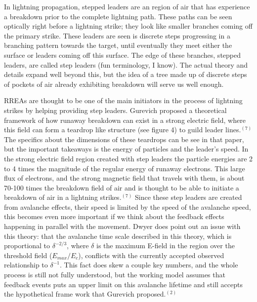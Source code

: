 \documentclass[11pt]{article}
\begin{document}
\begin{multicols*}{2}
    In lightning propagation, stepped leaders are an region of air that has experience a breakdown prior to the complete lightning path. These paths can be seen optically right before a lightning strike; they look like smaller branches coming off the primary strike. These leaders are seen is discrete steps progressing in a branching pattern towards the target, until eventually they meet either the surface or leaders coming off this surface. The edge of these branches, stepped leaders, are called step leaders (fun terminology, I know). The actual theory and details expand well beyond this, but the idea of a tree made up of discrete steps of pockets of air already exhibiting breakdown will serve us well enough.
    
    RREAs are thought to be one of the main initiators in the process of lightning strikes by helping providing step leaders. Gurevich proposed a theoretical framework of how runaway breakdown can exist in a strong electric field, where this field can form a teardrop like structure (see figure 4) to guild leader lines.$^{(7)}$  The specifics about the dimensions of these teardrops can be see in that paper, but the important takeaways is the energy of particles and the leader's speed. In the strong electric field region created with step leaders the particle energies are 2 to 4 times the magnitude of the regular energy of runaway electrons. This large flux of electrons, and the strong magnetic field that travels with them, is about 70-100 times the breakdown field of air and is thought to be able to initiate a breakdown of air in a lightning strikes.${^{(7)}}$ Since these step leaders are created from avalanche effects, their speed is limited by the speed of the avalanche speed, this becomes even more important if we think about the feedback effects happening in parallel with the movement. Dwyer does point out an issue with this theory: that the avalanche time scale described in this theory, which is proportional to $\delta^{-2/3}$, where $\delta$ is the maximum E-field in the region over the threshold field ($E_{max}/E_c$), conflicts with the currently accepted observed relationship to $\delta^{-1}$. This fact does skew a couple key numbers, and the whole process is still not fully understood, but the working model assumes that feedback events puts an upper limit on this avalanche lifetime and still accepts the hypothetical frame work that Gurevich proposed.$^{(2)}$
    

\end{multicols*}
\end{document}
